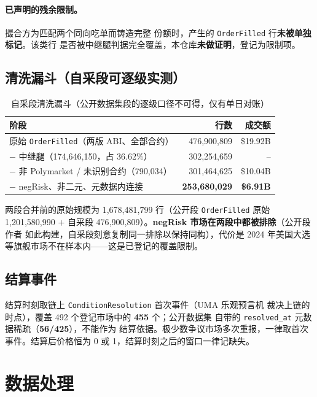 \documentclass[11pt, a4paper]{ctexart}
\newcommand{\code}[1]{\texttt{\small #1}}
\begin{document}
\paragraph{已声明的残余限制。}撮合方为匹配两个同向吃单而铸造完整
份额时，产生的 \code{OrderFilled} 行\textbf{未被单独标记}。该类行
是否被中继腿判据完全覆盖，本仓库\textbf{未做证明}，登记为限制项。

\subsection{清洗漏斗（自采段可逐级实测）}

\begin{table}[h!]\centering\small
\caption{自采段清洗漏斗（公开数据集段的逐级口径不可得，仅有单日对账）}
\label{tab:funnel}
\begin{tabular}{lrr}
\toprule
阶段 & 行数 & 成交额 \\
\midrule
原始 \code{OrderFilled}（两版 ABI、全部合约） & 476{,}900{,}809 & \$19.92B \\
$-$ 中继腿（174{,}646{,}150，占 36.62\%） & 302{,}254{,}659 & -- \\
$-$ 非 Polymarket / 未识别合约（790{,}034） & 301{,}464{,}625 & \$10.04B \\
$-$ negRisk、非二元、元数据内连接 & \textbf{253{,}680{,}029} & \textbf{\$6.91B} \\
\bottomrule
\end{tabular}
\end{table}

\noindent 两段合并前的原始规模为 1{,}678{,}481{,}799 行（公开段
\code{OrderFilled} 原始 1{,}201{,}580{,}990 $+$ 自采段
476{,}900{,}809）。\textbf{negRisk 市场在两段中都被排除}（公开段作者
如此构建，自采段刻意复制同一排除以保持同构），代价是 2024 年美国大选
等旗舰市场不在样本内——这是已登记的覆盖限制。

\subsection{结算事件}

结算时刻取链上 \code{ConditionResolution} 首次事件（UMA 乐观预言机
裁决上链的时点），覆盖 492 个登记市场中的 \textbf{455} 个；公开数据集
自带的 \code{resolved\_at} 元数据稀疏（\textbf{56/425}），不能作为
结算依据。极少数争议市场多次重报，一律取首次事件。结算后价格恒为
0 或 1，结算时刻之后的窗口一律记缺失。

\section{数据处理}\label{sec:process}
\end{document}

